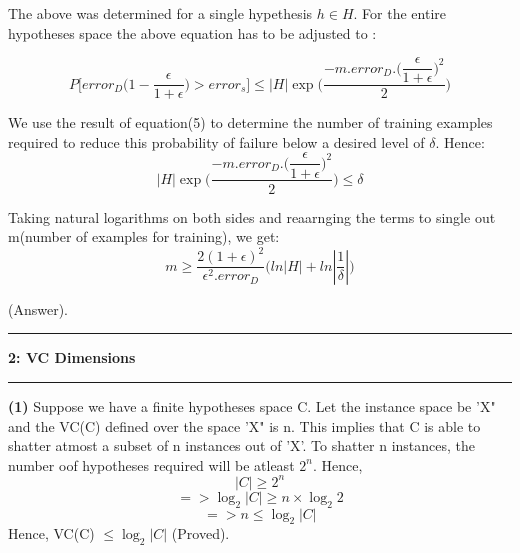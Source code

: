 \documentclass{article}
\newcommand\question[2]{\vspace{.25in}\hrule\textbf{#1: #2}\hrule\vspace{.10in}}
\renewcommand\part[1]{\vspace{.10in}\textbf{(#1)}}
\begin{document}
    The above was determined for a single hypethesis $h \in H$. For the entire hypotheses space the above equation has to be adjusted to :
    
    \begin{equation}
    P\bigg [  error_{D}\bigg (  1 - \dfrac{\epsilon}{1 + \epsilon}  \bigg ) > error_{s}  \bigg ] \leq |H|\exp \bigg (\dfrac{-m.error_{D}.\bigg (\dfrac{\epsilon}{1 + \epsilon}\bigg )^2}{2}\bigg )
    \end{equation}
    
    We use the result of equation(5) to determine the number of training examples required to reduce this probability of failure below a desired level of $\delta$. Hence: \newline
    \[ |H|\exp \bigg (\dfrac{-m.error_{D}.\bigg (\dfrac{\epsilon}{1 + \epsilon}\bigg )^2}{2}\bigg ) \leq \delta \]
    
    Taking natural logarithms on both sides and reaarnging the terms to single out m(number of examples for training), we get: \newline
    \begin{equation}
      m \geq \dfrac{2(1 + \epsilon)^2}{\epsilon^2 . error_{D}}\bigg (  ln|H| + ln|\dfrac{1}{\delta}| \bigg )
    \end{equation}
    
    (Answer).
  
  \question{2}{VC Dimensions}
  \part{1} Suppose we have a finite hypotheses space C. Let the instance space be 'X"  and the VC(C) defined over the space 'X" is n. This implies that C is able to shatter atmost a subset of n instances out of 'X'. To shatter n instances, the number oof hypotheses required will be atleast $2^n$. Hence, \newline
  \[|C| \geq 2^n\]
  \[=> \log_{2}|C| \geq n \times \log_{2}2\]
  \[=> n \leq \log_{2}|C| \]
  Hence, VC(C) $\leq \log_{2}|C|$ (Proved). \newline
  
\end{document}
